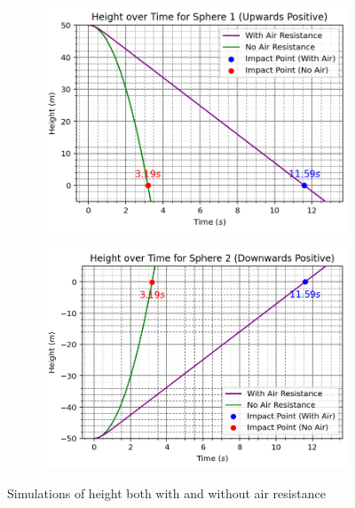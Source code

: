 \documentclass{article}
\begin{document}
\begin{figure}[h]
    \centering
    \begin{subfigure}{0.8\textwidth}
        \centering
        \includegraphics[width=1\textwidth]{Figures/ht1.png}
    \end{subfigure}
    \begin{subfigure}{0.8\textwidth}
        \centering
        \includegraphics[width=1\textwidth]{Figures/ht2.png}
    \end{subfigure}
    \caption{Simulations of height both with and without air resistance}
    \label{fig:sim_h}
\end{figure}

\clearpage
\end{document}
